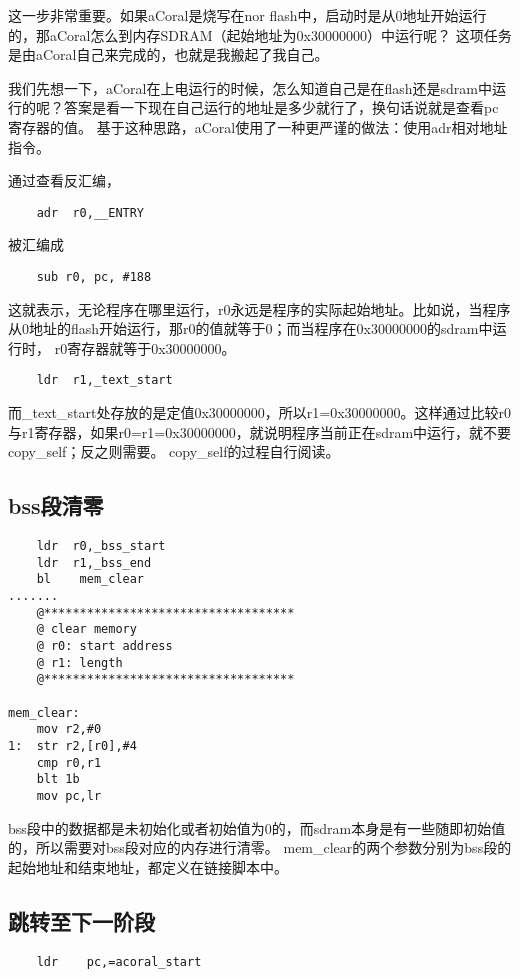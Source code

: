 这一步非常重要。如果aCoral是烧写在nor flash中，启动时是从0地址开始运行的，那aCoral怎么到内存SDRAM（起始地址为0x30000000）中运行呢？
这项任务是由aCoral自己来完成的，也就是我搬起了我自己。

我们先想一下，aCoral在上电运行的时候，怎么知道自己是在flash还是sdram中运行的呢？答案是看一下现在自己运行的地址是多少就行了，换句话说就是查看pc寄存器的值。
基于这种思路，aCoral使用了一种更严谨的做法：使用adr相对地址指令。

通过查看反汇编，
\begin{lstlisting}
	adr  r0,__ENTRY	
\end{lstlisting}

被汇编成

\begin{lstlisting}
	sub	r0, pc, #188
\end{lstlisting}

这就表示，无论程序在哪里运行，r0永远是程序的实际起始地址。比如说，当程序从0地址的flash开始运行，那r0的值就等于0；而当程序在0x30000000的sdram中运行时，
r0寄存器就等于0x30000000。

\begin{lstlisting}
	ldr  r1,_text_start
\end{lstlisting}

而\_text\_start处存放的是定值0x30000000，所以r1=0x30000000。这样通过比较r0与r1寄存器，如果r0=r1=0x30000000，就说明程序当前正在sdram中运行，就不要copy\_self；反之则需要。
copy\_self的过程自行阅读。

\subsection{bss段清零}
\begin{lstlisting}
	ldr  r0,_bss_start
	ldr  r1,_bss_end
	bl    mem_clear
.......
	@***********************************
	@ clear memory
	@ r0: start address
	@ r1: length
	@***********************************

mem_clear:
	mov r2,#0
1:	str r2,[r0],#4
	cmp r0,r1
	blt 1b
	mov pc,lr
\end{lstlisting}

bss段中的数据都是未初始化或者初始值为0的，而sdram本身是有一些随即初始值的，所以需要对bss段对应的内存进行清零。
mem\_clear的两个参数分别为bss段的起始地址和结束地址，都定义在链接脚本中。

\subsection{跳转至下一阶段}
\begin{lstlisting}
	ldr    pc,=acoral_start	
\end{lstlisting}

